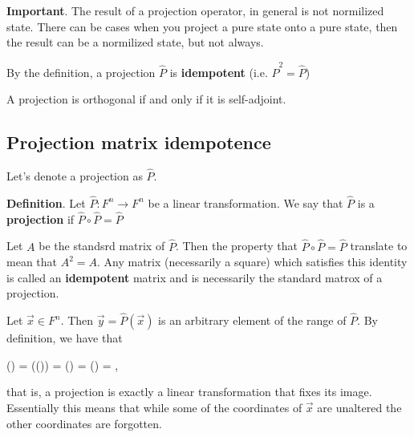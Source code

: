 \documentclass{article}
\begin{document}
\textbf{Important}. The result of a projection operator, in general is not normilized state. There can be cases when you project a pure state onto a pure state, then the result can be a normilized state, but not always.









By the definition, a projection $\hat{P}$ is \textbf{idempotent} (i.e. $\hat{P}^{2} = \hat{P}$)



A projection is orthogonal if and only if it is self-adjoint.


\subsection{Projection matrix idempotence}

Let's denote a projection as $\hat{P}$.

\textbf{Definition}. Let $\hat{P}: F^n \rightarrow F^n $ be a linear transformation. We say that $\hat{P}$ is a \textbf{projection} if $\hat{P} \circ \hat{P} = \hat{P} $


Let $A$ be the standsrd matrix of $\hat{P}$. Then the property that $\hat{P} \circ \hat{P} = \hat{P}$ translate to mean that $A^2 = A$. Any matrix (necessarily a square) which satisfies this identity is called an \textbf{idempotent} matrix and is necessarily the standard matrox of a projection.

Let $\vec{x} \in F^n$. Then $\vec{y} = \hat{P}(\vec{x})$ is an arbitrary element of the range of $\hat{P}$. By definition, we have that

\beq \label{projection_idempotent_1}
() = (()) =  \circ {}() = () = ,
\eeq

that is, a projection is exactly a linear transformation that fixes its image. Essentially this means that while some of the coordinates of $\vec{x}$ are unaltered the other coordinates are forgotten.
\end{document}
